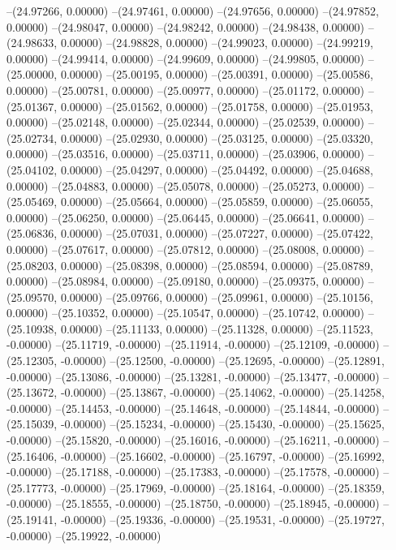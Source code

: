 --(24.97266, 0.00000)
--(24.97461, 0.00000)
--(24.97656, 0.00000)
--(24.97852, 0.00000)
--(24.98047, 0.00000)
--(24.98242, 0.00000)
--(24.98438, 0.00000)
--(24.98633, 0.00000)
--(24.98828, 0.00000)
--(24.99023, 0.00000)
--(24.99219, 0.00000)
--(24.99414, 0.00000)
--(24.99609, 0.00000)
--(24.99805, 0.00000)
--(25.00000, 0.00000)
--(25.00195, 0.00000)
--(25.00391, 0.00000)
--(25.00586, 0.00000)
--(25.00781, 0.00000)
--(25.00977, 0.00000)
--(25.01172, 0.00000)
--(25.01367, 0.00000)
--(25.01562, 0.00000)
--(25.01758, 0.00000)
--(25.01953, 0.00000)
--(25.02148, 0.00000)
--(25.02344, 0.00000)
--(25.02539, 0.00000)
--(25.02734, 0.00000)
--(25.02930, 0.00000)
--(25.03125, 0.00000)
--(25.03320, 0.00000)
--(25.03516, 0.00000)
--(25.03711, 0.00000)
--(25.03906, 0.00000)
--(25.04102, 0.00000)
--(25.04297, 0.00000)
--(25.04492, 0.00000)
--(25.04688, 0.00000)
--(25.04883, 0.00000)
--(25.05078, 0.00000)
--(25.05273, 0.00000)
--(25.05469, 0.00000)
--(25.05664, 0.00000)
--(25.05859, 0.00000)
--(25.06055, 0.00000)
--(25.06250, 0.00000)
--(25.06445, 0.00000)
--(25.06641, 0.00000)
--(25.06836, 0.00000)
--(25.07031, 0.00000)
--(25.07227, 0.00000)
--(25.07422, 0.00000)
--(25.07617, 0.00000)
--(25.07812, 0.00000)
--(25.08008, 0.00000)
--(25.08203, 0.00000)
--(25.08398, 0.00000)
--(25.08594, 0.00000)
--(25.08789, 0.00000)
--(25.08984, 0.00000)
--(25.09180, 0.00000)
--(25.09375, 0.00000)
--(25.09570, 0.00000)
--(25.09766, 0.00000)
--(25.09961, 0.00000)
--(25.10156, 0.00000)
--(25.10352, 0.00000)
--(25.10547, 0.00000)
--(25.10742, 0.00000)
--(25.10938, 0.00000)
--(25.11133, 0.00000)
--(25.11328, 0.00000)
--(25.11523, -0.00000)
--(25.11719, -0.00000)
--(25.11914, -0.00000)
--(25.12109, -0.00000)
--(25.12305, -0.00000)
--(25.12500, -0.00000)
--(25.12695, -0.00000)
--(25.12891, -0.00000)
--(25.13086, -0.00000)
--(25.13281, -0.00000)
--(25.13477, -0.00000)
--(25.13672, -0.00000)
--(25.13867, -0.00000)
--(25.14062, -0.00000)
--(25.14258, -0.00000)
--(25.14453, -0.00000)
--(25.14648, -0.00000)
--(25.14844, -0.00000)
--(25.15039, -0.00000)
--(25.15234, -0.00000)
--(25.15430, -0.00000)
--(25.15625, -0.00000)
--(25.15820, -0.00000)
--(25.16016, -0.00000)
--(25.16211, -0.00000)
--(25.16406, -0.00000)
--(25.16602, -0.00000)
--(25.16797, -0.00000)
--(25.16992, -0.00000)
--(25.17188, -0.00000)
--(25.17383, -0.00000)
--(25.17578, -0.00000)
--(25.17773, -0.00000)
--(25.17969, -0.00000)
--(25.18164, -0.00000)
--(25.18359, -0.00000)
--(25.18555, -0.00000)
--(25.18750, -0.00000)
--(25.18945, -0.00000)
--(25.19141, -0.00000)
--(25.19336, -0.00000)
--(25.19531, -0.00000)
--(25.19727, -0.00000)
--(25.19922, -0.00000)
